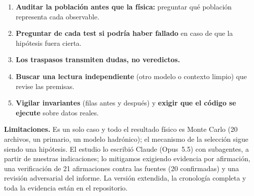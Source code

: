 \documentclass[11pt,a4paper]{article}
\begin{document}
\begin{enumerate}
  \item \textbf{Auditar la población antes que la física:} preguntar qué población representa cada observable.
  \item \textbf{Preguntar de cada test si podría haber fallado} en caso de que la hipótesis fuera cierta.
  \item \textbf{Los traspasos transmiten dudas, no veredictos.}
  \item \textbf{Buscar una lectura independiente} (otro modelo o contexto limpio) que revise las premisas.
  \item \textbf{Vigilar invariantes} (filas antes y después) y \textbf{exigir que el código se ejecute} sobre datos reales.
\end{enumerate}

\noindent\textbf{Limitaciones.} Es un solo caso y todo el resultado físico es Monte Carlo (20 archivos, un primario, un
modelo hadrónico); el mecanismo de la selección sigue siendo una hipótesis. El estudio lo escribió Claude (Opus~5.5)
con subagentes, a partir de nuestras indicaciones; lo mitigamos exigiendo evidencia por afirmación, una verificación de
21 afirmaciones contra las fuentes (20 confirmadas) y una revisión adversarial del informe. La versión extendida, la
cronología completa y toda la evidencia están en el repositorio.
\end{document}
